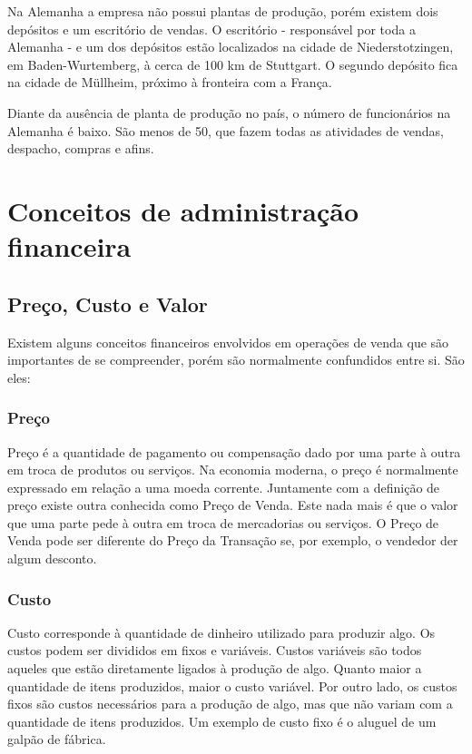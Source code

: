 \documentclass[12pt]{article}
\begin{document}
	Na Alemanha a empresa não possui plantas de produção, porém existem dois depósitos e um escritório de vendas. O escritório - responsável por toda a Alemanha - e um dos depósitos estão localizados na cidade de Niederstotzingen, em Baden-Wurtemberg, à cerca de 100 km de Stuttgart. O segundo depósito fica na cidade de Müllheim, próximo à fronteira com a França.

	Diante da ausência de planta de produção no país, o número de funcionários na Alemanha é baixo. São menos de 50, que fazem todas as atividades de vendas, despacho, compras e afins.

\section{Conceitos de administração financeira}

\subsection{Preço, Custo e Valor}
	
	Existem alguns conceitos financeiros envolvidos em operações de venda que são importantes de se compreender, porém são normalmente confundidos entre si. São eles:

\subsubsection{Preço}

	Preço é a quantidade de pagamento ou compensação dado por uma parte à outra em troca de produtos ou serviços. Na economia moderna, o preço é normalmente expressado em relação a uma moeda corrente. Juntamente com a definição de preço existe outra conhecida como Preço de Venda. Este nada mais é que o valor que uma parte pede à outra em troca de mercadorias ou serviços. O Preço de Venda pode ser diferente do Preço da Transação se, por exemplo, o vendedor der algum desconto.

\subsubsection{Custo}

	Custo corresponde à quantidade de dinheiro utilizado para produzir algo. Os custos podem ser divididos em fixos e variáveis. Custos variáveis são todos aqueles que estão diretamente ligados à produção de algo. Quanto maior a quantidade de itens produzidos, maior o custo variável. Por outro lado, os custos fixos são custos necessários para a produção de algo, mas que não variam com a quantidade de itens produzidos. Um exemplo de custo fixo é o aluguel de um galpão de fábrica.
\end{document}
